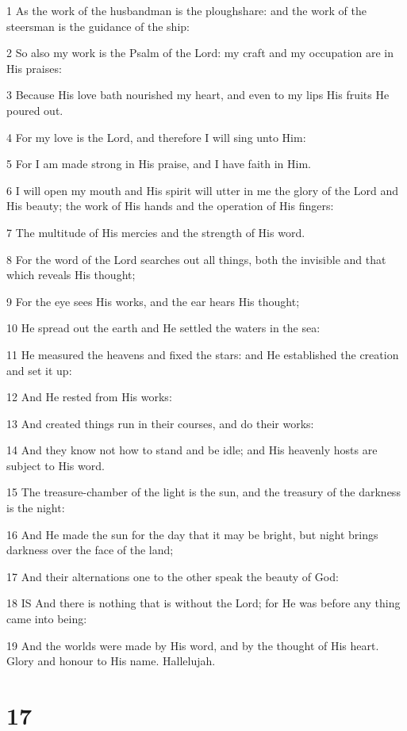 \par 1 As the work of the husbandman is the ploughshare: and the work of the steersman is the guidance of the ship:
\par 2 So also my work is the Psalm of the Lord: my craft and my occupation are in His praises:
\par 3 Because His love bath nourished my heart, and even to my lips His fruits He poured out.
\par 4 For my love is the Lord, and therefore I will sing unto Him:
\par 5 For I am made strong in His praise, and I have faith in Him.
\par 6 I will open my mouth and His spirit will utter in me the glory of the Lord and His beauty; the work of His hands and the operation of His fingers:
\par 7 The multitude of His mercies and the strength of His word.
\par 8 For the word of the Lord searches out all things, both the invisible and that which reveals His thought;
\par 9 For the eye sees His works, and the ear hears His thought;
\par 10 He spread out the earth and He settled the waters in the sea:
\par 11 He measured the heavens and fixed the stars: and He established the creation and set it up:
\par 12 And He rested from His works:
\par 13 And created things run in their courses, and do their works:
\par 14 And they know not how to stand and be idle; and His heavenly hosts are subject to His word.
\par 15 The treasure-chamber of the light is the sun, and the treasury of the darkness is the night:
\par 16 And He made the sun for the day that it may be bright, but night brings darkness over the face of the land;
\par 17 And their alternations one to the other speak the beauty of God:
\par 18 IS And there is nothing that is without the Lord; for He was before any thing came into being:
\par 19 And the worlds were made by His word, and by the thought of His heart. Glory and honour to His name. Hallelujah.

\chapter{17}

